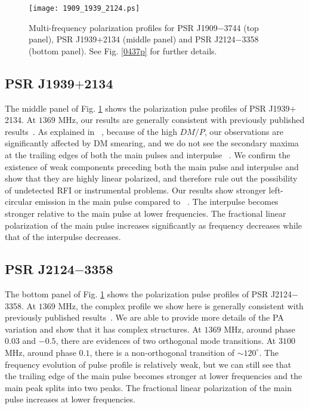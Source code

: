 \documentclass[useAMS,usenatbib]{mn2e}
\begin{document}
\begin{figure}
\begin{center}
\texttt{[image: 1909\_1939\_2124.ps]}
\caption{Multi-frequency polarization profiles for PSR J1909$-$3744 (top 
panel), PSR J1939$+$2134 (middle panel) and PSR J2124$-$3358 (bottom panel). 
See Fig. \ref{0437p} for further details.}
\label{1909p}
\end{center}
\end{figure}

\subsection{PSR J1939$+$2134}

The middle panel of Fig. \ref{1909p} shows the polarization pulse profiles of 
PSR J1939$+$2134.
%
At $1369$ MHz, our results are generally consistent with previously published 
results~\citep{Yan11}.
%
As explained in ~\citet{Yan11}, because of the high $DM/P$, our observations 
are significantly affected by DM smearing, and we do not see the secondary 
maxima at the trailing edges of both the main pulses and interpulse
~\citep{Thorsett90,Stairs99,Ord04}.
%
We confirm the existence of weak components preceding both the main pulse 
and interpulse and show that they are highly linear polarized, and therefore 
rule out the possibility of undetected RFI or instrumental problems.
%
Our results show stronger left-circular emission in the main pulse compared 
to ~\citep{Yan11}.
%
The interpulse becomes stronger relative to the main pulse at lower frequencies.
%
The fractional linear polarization of the main pulse increases significantly 
as frequency decreases while that of the interpulse decreases.



\subsection{PSR J2124$-$3358}

The bottom panel of Fig. \ref{1909p} shows the polarization pulse profiles of 
PSR J2124$-$3358.
%
At $1369$ MHz, the complex profile we show here is generally consistent with 
previously published results~\citep{Yan11}.
%
We are able to provide more details of the PA variation and show that it has 
complex structures.
%
At $1369$ MHz, around phase $0.03$ and $-0.5$, there are evidences of two 
orthogonal mode transitions.
%
At $3100$ MHz, around phase $0.1$, there is a non-orthogonal transition of 
$\sim120^{\circ}$.
%
The frequency evolution of pulse profile is relatively weak, but we can 
still see that the trailing edge of the main pulse becomes stronger at 
lower frequencies and the main peak splits into two peaks.
%
The fractional linear polarization of the main pulse increases at lower 
frequencies.
\end{document}
